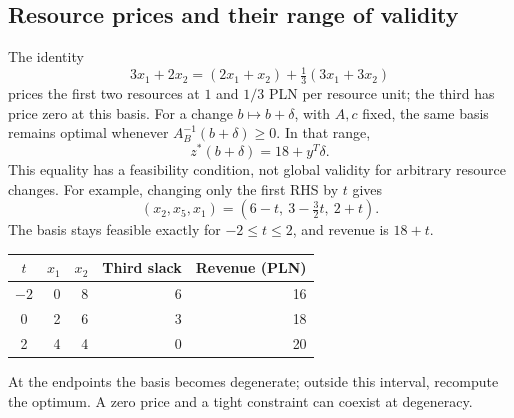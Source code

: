 \documentclass[11pt,a4paper]{article}
\begin{document}
\subsection{Resource prices and their range of validity}\label{sec:prices}
The identity
\[
  3x_1+2x_2=(2x_1+x_2)+\tfrac13(3x_1+3x_2)
\]
prices the first two resources at $1$ and $1/3$ PLN per resource unit; the third
has price zero at this basis. For a change $b\mapsto b+\delta$, with $A,c$
fixed, the same basis remains optimal whenever $A_B^{-1}(b+\delta)\geq0$.
In that range,
\[
  z^*(b+\delta)=18+y^T\delta.
\]
This equality has a feasibility condition, not global validity for arbitrary
resource changes. For example, changing only the first RHS by $t$ gives
\[
  (x_2,x_5,x_1)=(6-t,\ 3-\tfrac32t,\ 2+t).
\]
The basis stays feasible exactly for $-2\leq t\leq2$, and revenue is $18+t$.
\begin{center}
  \begin{tabular}{crrrr}\toprule
    $t$ & $x_1$ & $x_2$ & Third slack & Revenue (PLN)\\\midrule
    $-2$ & 0 & 8 & 6 & 16\\
    0 & 2 & 6 & 3 & 18\\
    2 & 4 & 4 & 0 & 20\\\bottomrule
  \end{tabular}
\end{center}
At the endpoints the basis becomes degenerate; outside this interval, recompute
the optimum. A zero price and a tight constraint can coexist at degeneracy.
\end{document}
